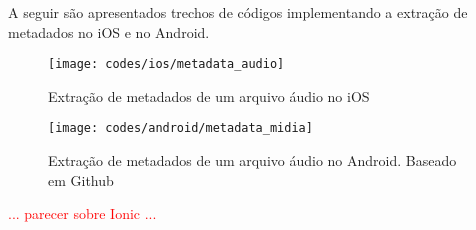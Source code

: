 A seguir são apresentados trechos de códigos implementando a extração de metadados no iOS e no Android.

\begin{figure}[H]
	\centering
	\texttt{[image: codes/ios/metadata\_audio]}
	\caption[Extração de metadados de um arquivo áudio no iOS]{Extração de metadados de um arquivo áudio no iOS}
	\label{fig:metadata_audio-ios}
\end{figure}

\begin{figure}[H]
	\centering
	\texttt{[image: codes/android/metadata\_midia]}
	\caption[Extração de metadados de um arquivo áudio no Android]{Extração de metadados de um arquivo áudio no Android. Baseado em Github\protect\footnotemark}
	\label{fig:metadata_midia-android}
\end{figure}


\textcolor{red}{... parecer sobre Ionic ...}

